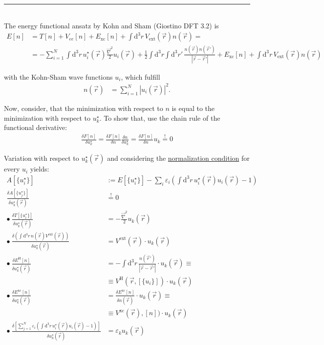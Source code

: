 \documentclass{article}
\newcommand{\diff}{\mathrm{d}}
\newcommand{\lr}[1]{\left(#1\right)}
\newcommand{\lreck}[1]{\left[#1\right]}
\begin{document}
{\color{violet}
\hrule
	\\
	The energy functional ansatz by Kohn and Sham (Giostino DFT 3.2) is
		\begin{align*}
			E[n] &= T[n] + V_{ee}[n] + E_\text{xc}[n] + \int \diff^3r \, V_\text{ext}(\vec{r}) n(\vec{r}) = \\
			&= -\sum_{i=1}^N \int \diff^3r \, u_i^\star(\vec{r}) \frac{\vec{\nabla}^2}{2} u_i(\vec{r}) + \frac{1}{2} \int \diff^3r \int \diff^3r' \, \frac{n(\vec{r}) n(\vec{r}')}{|\vec{r} - \vec{r}'|} + E_\text{xc}[n] + \int \diff^3r \, V_\text{ext}(\vec{r}) n(\vec{r})
		\end{align*}
	
	with the Kohn-Sham wave functions $u_i$, which fulfill
		\begin{align*}
			n(\vec{r}) &= \sum_{i=1}^N |u_i(\vec{r})|^2.
		\end{align*}

	Now, consider, that the minimization with respect to $n$ is equal to the minimization with respect to $u_k^\star$. To show that, use the chain rule of the functional derivative:
		\begin{align*}
			\frac{\delta F[n]}{\delta u_k^\star} = \frac{\delta F[n]}{\delta n} \frac{\delta n}{\delta u_k^\star} = \frac{\delta F[n]}{\delta n} u_k \stackrel{!}{=} 0
		\end{align*}

	Variation with respect to $u_k^\star(\vec{r})$ and considering the \underline{normalization condition} for every $u_i$ yields:
		\begin{align*}
			A[\{u_i^\star\}] &:= E[\{u_i^\star\}] - \sum_i \varepsilon_i \lr{ \int \diff^3r \, u_i^\star(\vec{r}) u_i(\vec{r}) - 1} \\
			\frac{\delta A[\{u_j^\star\}]}{\delta u_k^\star(\vec{r})} &\stackrel{!}{=} 0 \\
			\bullet \ \frac{\delta T[\{u_i^\star\}]}{\delta u_k^\star(\vec{r})} &= -\frac{\vec{\nabla}^2}{2} u_k(\vec{r}) \\
			\bullet \ \frac{\delta \lr{ \int \diff^3r \, n(\vec{r}) V^\text{ext}(\vec{r}) }}{\delta u_k^\star(\vec{r})} &= V^\text{ext}(\vec{r}) \cdot u_k(\vec{r})\\
			\bullet \ \frac{\delta E^\text{H}[n]}{\delta u_k^\star(\vec{r})} &= -\int \diff^3r \, \frac{n(\vec{r}')}{|\vec{r} - \vec{r}'|} \cdot u_k(\vec{r}) \equiv \\
			&\equiv V^\text{H}(\vec{r},[\{u_i\}]) \cdot u_k(\vec{r}) \\
			\bullet \ \frac{\delta E^\text{xc}[n]}{\delta u_k^\star(\vec{r})} &= \frac{\delta E^\text{xc}[n]}{\delta n(\vec{r})} \cdot u_k(\vec{r}) \equiv \\
			&\equiv V^\text{xc}(\vec{r}),[n]) \cdot u_k(\vec{r}) \\
			\bullet \ \frac{\delta \lreck{ \sum_{j=1}^N \varepsilon_i \lr{ \int \diff^3r \, u_i^\star(\vec{r}) u_i(\vec{r}) - 1} }}{\delta u_k^\star(\vec{r})} &= \varepsilon_k u_k(\vec{r})
		\end{align*}
	
}
\end{document}
